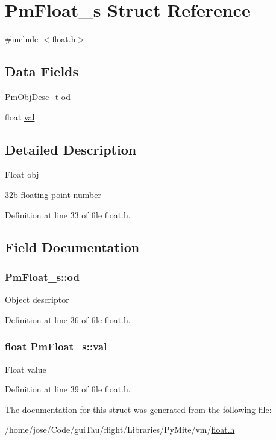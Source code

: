 \hypertarget{struct_pm_float__s}{\section{Pm\-Float\-\_\-s Struct Reference}
\label{struct_pm_float__s}
}


{\ttfamily \#include $<$float.\-h$>$}

\subsection*{Data Fields}
\begin{DoxyCompactItemize}
\item 
\hyperlink{obj_8h_a72d816790acd8eb550fb25268c2b3489}{Pm\-Obj\-Desc\-\_\-t} \hyperlink{struct_pm_float__s_a6d3c2da9ccd1ca0e84adb2360aa26ebc}{od}
\item 
float \hyperlink{struct_pm_float__s_aec77dcfa339cf7ee38801928546ef408}{val}
\end{DoxyCompactItemize}


\subsection{Detailed Description}
Float obj

32b floating point number 

Definition at line 33 of file float.\-h.



\subsection{Field Documentation}
\hypertarget{struct_pm_float__s_a6d3c2da9ccd1ca0e84adb2360aa26ebc}{
\subsubsection[{od}]{ Pm\-Float\-\_\-s\-::od}}\label{struct_pm_float__s_a6d3c2da9ccd1ca0e84adb2360aa26ebc}
Object descriptor 

Definition at line 36 of file float.\-h.

\hypertarget{struct_pm_float__s_aec77dcfa339cf7ee38801928546ef408}{
\subsubsection[{val}]{\setlength{\rightskip}{0pt plus 5cm}float Pm\-Float\-\_\-s\-::val}}\label{struct_pm_float__s_aec77dcfa339cf7ee38801928546ef408}
Float value 

Definition at line 39 of file float.\-h.



The documentation for this struct was generated from the following file\-:\begin{DoxyCompactItemize}
\item 
/home/jose/\-Code/gui\-Tau/flight/\-Libraries/\-Py\-Mite/vm/\hyperlink{float_8h}{float.\-h}\end{DoxyCompactItemize}
